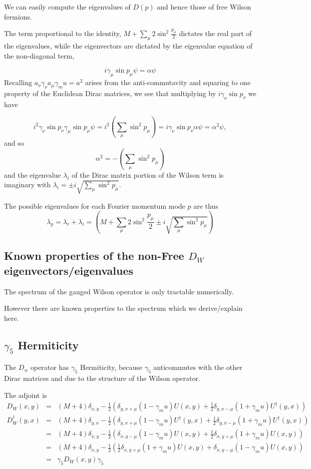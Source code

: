 \documentclass[letter,10pt]{report}
\begin{document}
We can easily compute the eigenvalues of $D(p)$ and hence those of free Wilson fermions.

The term proportional to the identity, $ M + \sum_\mu 2 \sin^2 \frac{p_\mu}{2}$ dictates the real part of the
eigenvalues, while the eigenvectors are dictated by the eigenvalue equation of the non-diagonal term,

$$
i \gamma_\mu \sin p_\mu \psi = \alpha \psi
$$
Recalling $ a_\nu \gamma_\nu a_\mu \gamma_mu = a^2$ arises from the anti-commutavity and squaring to one property
of the Euclidean Dirac matrices, we see that multiplying by $i \gamma_\nu \sin p_\nu $ we have

$$
i^2 \gamma_\nu \sin p_\nu \gamma_\mu \sin p_\mu \psi = i^2 \left(\sum_\mu \sin^2 p_\mu\right) =   i \gamma_\nu \sin p_\nu \alpha \psi = \alpha^2 \psi,
$$
and so
$$
\alpha^2 = - \left(\sum_\mu \sin^2 p_\mu\right)
$$
and the eigenvalue $\lambda_i$ of the Dirac matrix portion of the Wilson term is imaginary with $\lambda_i = \pm i \sqrt{\sum_\mu \sin^2 p_\mu }$.

The possible eigenvalues for each Fourier momentum mode $p$ are thus
$$
\lambda_p = \lambda_r + \lambda_i = \left( M + \sum_\mu 2 \sin^2 \frac{p_\mu}{2} \pm  i \sqrt{\sum_\mu \sin^2 p_\mu } \right)
$$


\subsection{Known properties of the non-Free $D_W$ eigenvectors/eigenvalues}

The spectrum of the gauged Wilson operator is only tractable numerically.

However there are known properties to the spectrum which we derive/explain here.

\subsection{$\gamma_5$ Hermiticity}

The $D_w$ operator has $\gamma_5$ Hermiticity, because $\gamma_5$ anticommutes with the other Dirac matrices and due to the
structure of the Wilson operator.

The adjoint is
\begin{eqnarray}
  D_W(x,y) &=& (M+4)\delta_{x,y} - \frac{1}{2}\left( \delta_{y,x+\mu} (1-\gamma_mu) U(x,y)  + \frac{1}{2} \delta_{y,x-\mu} (1+\gamma_mu) U^\dagger(y,x) \right)\\
  D_W^\dagger(y,x)
  &=& (M+4)\delta_{y,x} - \frac{1}{2}\left( \delta_{y,x+\mu} (1-\gamma_mu) U^\dagger(y,x)  + \frac{1}{2} \delta_{y,x-\mu} (1+\gamma_mu) U^\dagger(y,x) \right)\\
  &=& (M+4)\delta_{x,y} - \frac{1}{2}\left( \delta_{x,y-\mu} (1-\gamma_mu) U(x,y)  + \frac{1}{2} \delta_{x,y+\mu} (1+\gamma_mu) U(x,y) \right)\\
  &=& (M+4)\delta_{x,y} - \frac{1}{2}\left( \frac{1}{2} \delta_{x,y+\mu} (1+\gamma_mu) U(x,y) + \delta_{x,y-\mu} (1-\gamma_mu) U(x,y)  \right)\\
  &=&  \gamma_5 D_W(x,y) \gamma_5
\end{eqnarray}
\end{document}
